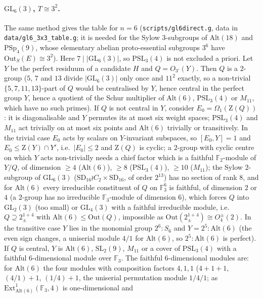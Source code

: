 \documentclass[11pt]{article}
\theoremstyle{definition}
\theoremstyle{remark}
\newcommand{\Out}{\mathrm{Out}}
\newcommand{\GL}{\mathrm{GL}}
\newcommand{\SL}{\mathrm{SL}}
\newcommand{\PSL}{\mathrm{PSL}}
\newcommand{\PSp}{\mathrm{PSp}}
\newcommand{\Alt}{\mathrm{Alt}}
\newcommand{\Z}{\mathrm{Z}}
\begin{document}
\paragraph{$\GL_6(3)$, $T\cong 3^2$.}  The same method gives the table for
$n=6$ (\texttt{scripts/gl6direct.g}, data in
\texttt{data/gl6\_3x3\_table.g}; it is needed for the Sylow $3$-subgroups of
$\Alt(18)$ and $\PSp_4(9)$, whose elementary abelian proto-essential
subgroups $3^6$ have $\Out_S(E)\cong3^2$).  Here $7\mid|\GL_6(3)|$, so
$\PSL_3(4)$ is not excluded a priori.  Let $Y$ be the perfect residuum of
a candidate $H$ and $Q=O_{3'}(Y)$.  Then $Q$ is a $2$-group ($5$, $7$ and
$13$ divide $|\GL_6(3)|$ only once and $11^2$ exactly, so a non-trivial
$\{5,7,11,13\}$-part of $Q$ would be centralised by $Y$, hence central in
the perfect group $Y$, hence a quotient of the Schur multiplier of
$\Alt(6)$, $\PSL_3(4)$ or $M_{11}$, which have no such primes).  If $Q$ is
not central in $Y$, consider $E_0=\Omega_1(\Z(Q))$: it is diagonalisable
and $Y$ permutes its at most six weight spaces; $\PSL_3(4)$ and $M_{11}$
act trivially on at most six points and $\Alt(6)$ trivially or
transitively.  In the trivial case $E_0$ acts by scalars on
$Y$-invariant subspaces, so $[E_0,Y]=1$ and $E_0\le\Z(Y)\cap Y'$, i.e.\
$|E_0|\le2$ and $\Z(Q)$ is cyclic; a $2$-group with cyclic centre on
which $Y$ acts non-trivially needs a chief factor which is a faithful
$\mathbb{F}_2$-module of $Y/Q$, of dimension $\ge4$ ($\Alt(6)$), $\ge8$
($\PSL_3(4)$), $\ge10$ ($M_{11}$); the Sylow $2$-subgroup of $\GL_6(3)$
($\mathrm{SD}_{16}\wr C_2\times\mathrm{SD}_{16}$, of order $2^{13}$) has no
section of rank $8$, and for $\Alt(6)$ every irreducible constituent of
$Q$ on $\mathbb{F}_3^6$ is faithful, of dimension $2$ or $4$ (a $2$-group has
no irreducible $\mathbb{F}_3$-module of dimension $6$), which forces $Q$
into $\GL_2(3)$ (too small) or $\GL_4(3)$ with a faithful irreducible
module, i.e.\ $Q\supseteq 2^{1+4}_\pm$ with $\Alt(6)\le\Out(Q)$, impossible
as $\Out(2^{1+4}_\pm)\cong O_4^\pm(2)$.  In the transitive case $Y$ lies in
the monomial group $2^6{:}S_6$ and $Y=2^5{:}\Alt(6)$ (the even sign
changes, a uniserial module $4/1$ for $\Alt(6)$, so $2^5{:}\Alt(6)$ is
perfect).  If $Q$ is central, $Y$ is $\Alt(6)$, $\SL_2(9)$, $M_{11}$ or a
cover of $\PSL_3(4)$ with a faithful $6$-dimensional module over
$\mathbb{F}_3$.  The faithful $6$-dimensional modules are: for $\Alt(6)$
the four modules with composition factors $4,1,1$ ($4+1+1$, $(4/1)+1$,
$(1/4)+1$, the uniserial permutation module $1/4/1$; as
$\mathrm{Ext}^1_{\Alt(6)}(\mathbb{F}_3,4)$ is one-dimensional and
\end{document}
